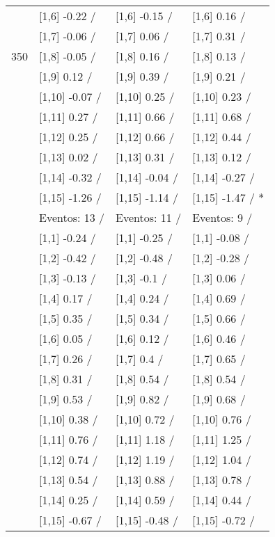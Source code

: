\begin{table}
\begin{tabular}[t]{llll}
 & {}[1,6] -0.22  / & {}[1,6] -0.15  / & {}[1,6] 0.16  /\\
 & {}[1,7] -0.06  / & {}[1,7] 0.06  / & {}[1,7] 0.31  /\\
350 & {}[1,8] -0.05  / & {}[1,8] 0.16  / & {}[1,8] 0.13  /\\
\addlinespace
 & {}[1,9] 0.12  / & {}[1,9] 0.39  / & {}[1,9] 0.21  /\\
 & {}[1,10] -0.07  / & {}[1,10] 0.25  / & {}[1,10] 0.23  /\\
 & {}[1,11] 0.27  / & {}[1,11] 0.66  / & {}[1,11] 0.68  /\\
 & {}[1,12] 0.25  / & {}[1,12] 0.66  / & {}[1,12] 0.44  /\\
 & {}[1,13] 0.02  / & {}[1,13] 0.31  / & {}[1,13] 0.12  /\\
\addlinespace
 & {}[1,14] -0.32  / & {}[1,14] -0.04  / & {}[1,14] -0.27  /\\
 & {}[1,15] -1.26  / & {}[1,15] -1.14  / & {}[1,15] -1.47  / *\\
 & Eventos:  13 / & Eventos:  11 / & Eventos:  9 /\\
 & {}[1,1] -0.24  / & {}[1,1] -0.25  / & {}[1,1] -0.08  /\\
 & {}[1,2] -0.42  / & {}[1,2] -0.48  / & {}[1,2] -0.28  /\\
\addlinespace
 & {}[1,3] -0.13  / & {}[1,3] -0.1  / & {}[1,3] 0.06  /\\
 & {}[1,4] 0.17  / & {}[1,4] 0.24  / & {}[1,4] 0.69  /\\
 & {}[1,5] 0.35  / & {}[1,5] 0.34  / & {}[1,5] 0.66  /\\
 & {}[1,6] 0.05  / & {}[1,6] 0.12  / & {}[1,6] 0.46  /\\
 & {}[1,7] 0.26  / & {}[1,7] 0.4  / & {}[1,7] 0.65  /\\
\addlinespace
500 & {}[1,8] 0.31  / & {}[1,8] 0.54  / & {}[1,8] 0.54  /\\
 & {}[1,9] 0.53  / & {}[1,9] 0.82  / & {}[1,9] 0.68  /\\
 & {}[1,10] 0.38  / & {}[1,10] 0.72  / & {}[1,10] 0.76  /\\
 & {}[1,11] 0.76  / & {}[1,11] 1.18  / & {}[1,11] 1.25  /\\
 & {}[1,12] 0.74  / & {}[1,12] 1.19  / & {}[1,12] 1.04  /\\
\addlinespace
 & {}[1,13] 0.54  / & {}[1,13] 0.88  / & {}[1,13] 0.78  /\\
 & {}[1,14] 0.25  / & {}[1,14] 0.59  / & {}[1,14] 0.44  /\\
 & {}[1,15] -0.67  / & {}[1,15] -0.48  / & {}[1,15] -0.72  /\\
\bottomrule
\end{tabular}
\end{table}
